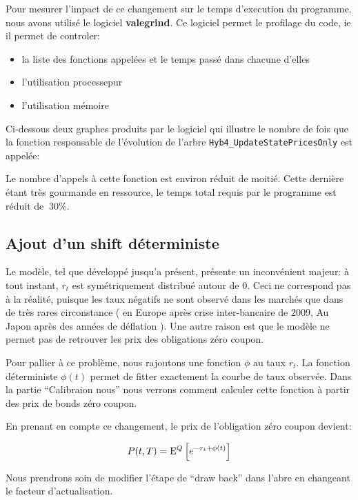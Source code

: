 Pour mesurer l'impact de ce changement sur le temps d'execution du programme, nous avons utilisé le logiciel \textbf{valegrind}. Ce logiciel  permet le profilage du code, ie il permet de controler:
\begin{itemize}
\item la liste des fonctions appelées et le temps passé dans chacune d'elles
\item l'utilisation processepur
\item l'utilisation mémoire
\end{itemize}

Ci-dessous deux graphes produits par le logiciel qui illustre le nombre de fois que la fonction responsable de l'évolution de l'arbre \texttt{Hyb4_UpdateStatePricesOnly} est appelée:


Le nombre d'appels à cette fonction est environ réduit de moitié. Cette dernière étant très gourmande en ressource, le temps total requis par le programme est réduit de $~30\%$.

\subsection{Ajout d'un shift déterministe}
Le modèle, tel que développé jusqu'a présent, présente un inconvénient majeur: à tout instant, $r_t$ est symétriquement distribué autour de $0$. Ceci ne correspond pas à la réalité, puisque les taux négatifs ne sont observé dans les marchés que dans de très rares circonstance ( en Europe après crise inter-bancaire de 2009, Au Japon après des années de déflation ). Une autre raison est que le modèle ne permet pas de retrouver les prix des obligations zéro coupon.

Pour pallier à ce problème, nous rajoutons une fonction $\phi$ au taux $r_t$. La fonction déterministe $\phi(t)$ permet de fitter exactement la courbe de taux observée. Dans la partie ``Calibraion nous'' nous verrons comment calculer cette fonction à partir des prix de bonds zéro coupon.

En prenant en compte ce changement, le prix de l'obligation zéro coupon devient:

$$P(t, T) = \mathrm{E}^Q \left[  e^{-r_t + \phi(t)} \right]$$

Nous prendrons soin de modifier l'étape de ``draw back'' dans l'abre en changeant le facteur d'actualisation.

